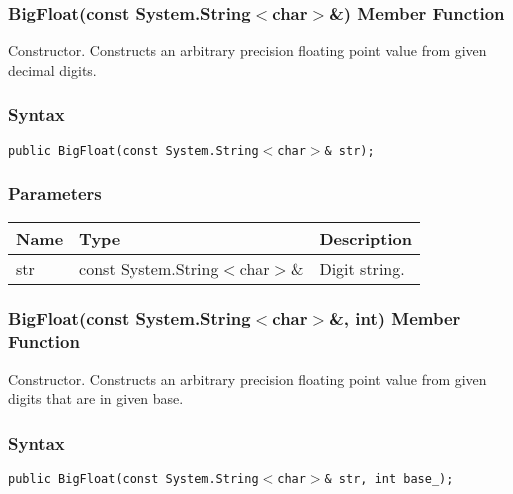 \documentclass[a4paper,oneside,11.000000pt]{book}
\begin{document}
\hypertarget{System.Numerics.Multiprecision.BigFloat.constructor.P.System.Numerics.Multiprecision.BigFloat.C.R.System.String.char}{\subsubsection*{BigFloat(const System.String$<$char$>$\&) Member Function}}
\begin{flushleft}
Constructor. Constructs an arbitrary precision floating point value from given decimal digits.

\end{flushleft}
\subsubsection*{Syntax}
\texttt{public BigFloat(const System.String$<$char$>$\& str);}
\subsubsection*{Parameters}
\begin{flushleft}
\begin{supertabular}[l]{lll}
\textbf{Name}
& \textbf{Type}
& \textbf{Description}
\\
\hline
str
& const System.\-String$<$\-char$>$\-\&\-
& Digit string.

\\
\end{supertabular}

\end{flushleft}
\clearpage

\hypertarget{System.Numerics.Multiprecision.BigFloat.constructor.P.System.Numerics.Multiprecision.BigFloat.C.R.System.String.char.int}{\subsubsection*{BigFloat(const System.String$<$char$>$\&, int) Member Function}}
\begin{flushleft}
Constructor. Constructs an arbitrary precision floating point value from given digits that are in given base.

\end{flushleft}
\subsubsection*{Syntax}
\texttt{public BigFloat(const System.String$<$char$>$\& str, int base\_);}
\end{document}
